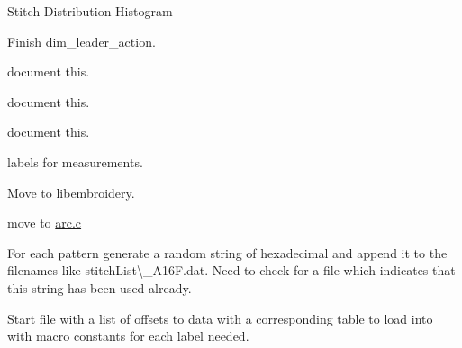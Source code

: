 \begin{DoxyRefList}
\label{todo__todo000029}%
%
Stitch Distribution Histogram 
\item[Member \mbox{\hyperlink{imgui__main_8c_afa6e9c56ed9f01289bfe44c7551ba583}{dim\+\_\+leader\+\_\+action}} (void)]\label{todo__todo000193}%
%
Finish dim\+\_\+leader\+\_\+action.  
\item[Member \mbox{\hyperlink{imgui__main_8c_af0780bc626b0edd93a5323210a85ab58}{disable\+\_\+move\+\_\+rapid\+\_\+fire}} (void)]\label{todo__todo000040}%
%
document this.  
\item[Member \mbox{\hyperlink{imgui__main_8c_a4c786f303137470eabb4db685c64d56a}{disable\+Prompt\+Rapid\+Fire}} (void)]\label{todo__todo000180}%
%
document this.  
\item[Member \mbox{\hyperlink{imgui__main_8c_ad0ea9b475e8aa2c58004ebc6bf95df1d}{draw\+\_\+grid}} (void)]\label{todo__todo000080}%
%
document this.  
\item[Member \mbox{\hyperlink{imgui__main_8c_a1d1368160b5595cf6796e81b5ee3cb43}{draw\+\_\+rulers}} (void)]\label{todo__todo000079}%
%
labels for measurements.  
\item[Member \mbox{\hyperlink{imgui__main_8c_a1291ffefd4b741c0b342ed03934c431d}{emb\+\_\+clamp}} (Emb\+Real lower, Emb\+Real x, Emb\+Real upper)]\label{todo__todo000009}%
%
Move to libembroidery.  
\item[Member \mbox{\hyperlink{main_8c_a16e1e46c5c33874fc9a63476e70c0d66}{emb\+Arc\+\_\+print}} (Emb\+Arc arc)]\label{todo__todo000250}%
%
move to \mbox{\hyperlink{arc_8c}{arc.\+c}}  
\item[Page \mbox{\hyperlink{md_extern_libembroidery_src_embedded}{embedded}} ]\label{todo__todo000226}%
%
For each pattern generate a random string of hexadecimal and append it to the filenames like {\ttfamily stitch\+List\textbackslash{}\+\_\+\+A16\+F.\+dat}. Need to check for a file which indicates that this string has been used already.

\label{todo__todo000225}%
%
Start file with a list of offsets to data with a corresponding table to load into with macro constants for each label needed.


\end{DoxyRefList}
